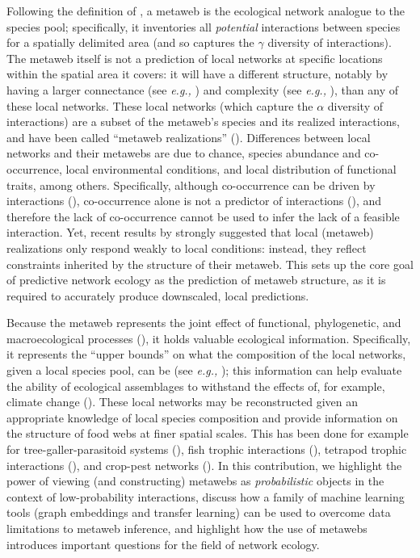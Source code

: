 \begin{refsection}
Following the definition of \cite{Dunne2006Network}, a metaweb is the
ecological network analogue to the species pool; specifically, it
inventories all \emph{potential} interactions between species for a
spatially delimited area (and so captures the \(\gamma\) diversity of
interactions). The metaweb itself is not a prediction of local networks
at specific locations within the spatial area it covers: it will have a
different structure, notably by having a larger connectance (see
\emph{e.g.,} \cite{Wood2015Effects}) and complexity (see \emph{e.g.,}
\cite{Galiana2022Ecological}), than any of these local networks. These local
networks (which capture the \(\alpha\) diversity of interactions) are a
subset of the metaweb's species and its realized interactions, and have
been called ``metaweb realizations'' (\cite{Poisot2015Species}).
Differences between local networks and their metawebs are due to chance,
species abundance and co-occurrence, local environmental conditions, and
local distribution of functional traits, among others. Specifically,
although co-occurrence can be driven by interactions
(\cite{Cazelles2016Theory}), co-occurrence alone is not a predictor of
interactions (\cite{Blanchet2020Cooccurrence, Thurman2019Testing}), and
therefore the lack of co-occurrence cannot be used to infer the lack of
a feasible interaction. Yet, recent results by \cite{Saravia2021Ecological}
strongly suggested that local (metaweb) realizations only respond weakly
to local conditions: instead, they reflect constraints inherited by the
structure of their metaweb. This sets up the core goal of predictive
network ecology as the prediction of metaweb structure, as it is
required to accurately produce downscaled, local predictions.

Because the metaweb represents the joint effect of functional,
phylogenetic, and macroecological processes
(\cite{Morales-Castilla2015Inferring}), it holds valuable ecological
information. Specifically, it represents the ``upper bounds'' on what
the composition of the local networks, given a local species pool, can
be (see \emph{e.g.,} \cite{McLeod2021Sampling}); this information can help
evaluate the ability of ecological assemblages to withstand the effects
of, for example, climate change (\cite{Fricke2022Effects}). These local
networks may be reconstructed given an appropriate knowledge of local
species composition and provide information on the structure of food
webs at finer spatial scales. This has been done for example for
tree-galler-parasitoid systems (\cite{Gravel2018Bringing}), fish trophic
interactions (\cite{Albouy2019Marine}), tetrapod trophic interactions
(\cite{Braga2019Spatial, OConnor2020Unveiling}), and crop-pest networks
(\cite{Grunig2020Crop}). In this contribution, we highlight the power of
viewing (and constructing) metawebs as \emph{probabilistic} objects in
the context of low-probability interactions, discuss how a family of
machine learning tools (graph embeddings and transfer learning) can be
used to overcome data limitations to metaweb inference, and highlight
how the use of metawebs introduces important questions for the field of
network ecology.


\end{refsection}
